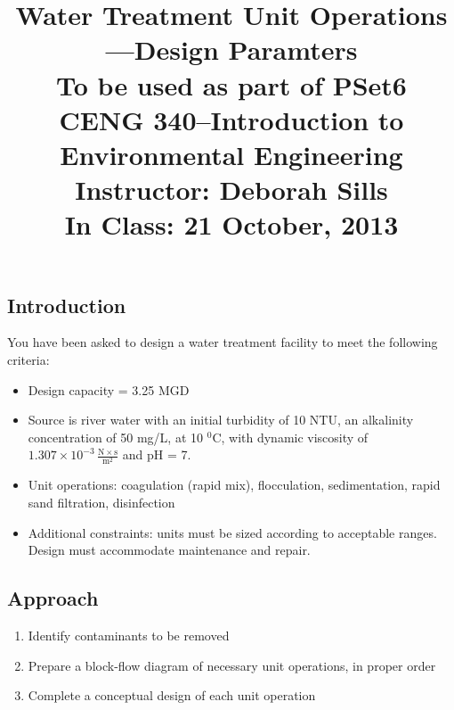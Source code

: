 \documentclass[11pt,letterpaper]{article}
\begin{document}
\setlength{\parindent}{0cm} 



\frenchspacing

\setlength{\textwidth}{6.25in}

\title {\Large{\textbf{Water Treatment Unit Operations---Design Paramters}}\\ \large{To be used as part of PSet6\\CENG 340--Introduction to Environmental Engineering\\
Instructor: Deborah Sills\\ \textbf{In Class: 21 October, 2013}}}

\author {}
\date {}
\maketitle

\vspace{-2cm}
\subsection *{Introduction}
You have been asked to design a water treatment facility to meet the following criteria:

\begin{itemize}
\item Design capacity = 3.25 MGD
\item Source is river water with an initial turbidity of 10 NTU, an alkalinity concentration of 50 mg/L, at 10 $^0$C, with dynamic viscosity of $\mathrm{1.307 \times 10^{-3}\, \frac{N\times s}{m^2}}$ and pH = 7.
\item Unit operations: coagulation (rapid mix), flocculation, sedimentation, rapid sand filtration, disinfection
\item Additional constraints: units must be sized according to acceptable ranges.  Design must accommodate maintenance and repair.\\
\end{itemize}

\vspace{-0.2in}

\subsection *{Approach}
\begin{enumerate}
\item Identify contaminants to be removed
\item Prepare a block-flow diagram of necessary unit operations, in proper order
\item Complete a conceptual design of each unit operation
\end{enumerate}
\end{document}
